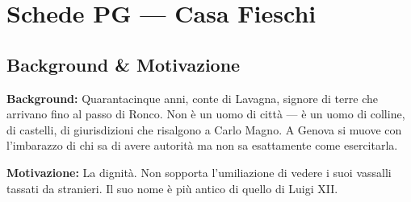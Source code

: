 \chapter{Schede PG --- Casa Fieschi}



\section*{Background \& Motivazione}
\begin{rulebox}{}
\textbf{Background:} Quarantacinque anni, conte di Lavagna, signore di terre che arrivano fino al passo di Ronco. Non \`e un uomo di citt\`a --- \`e un uomo di colline, di castelli, di giurisdizioni che risalgono a Carlo Magno. A Genova si muove con l'imbarazzo di chi sa di avere autorit\`a ma non sa esattamente come esercitarla.

\medskip\noindent\textcolor{FieschiGreen}{\textbf{Motivazione:}} La dignit\`a. Non sopporta l'umiliazione di vedere i suoi vassalli tassati da stranieri. Il suo nome \`e pi\`u antico di quello di Luigi XII.
\end{rulebox}

